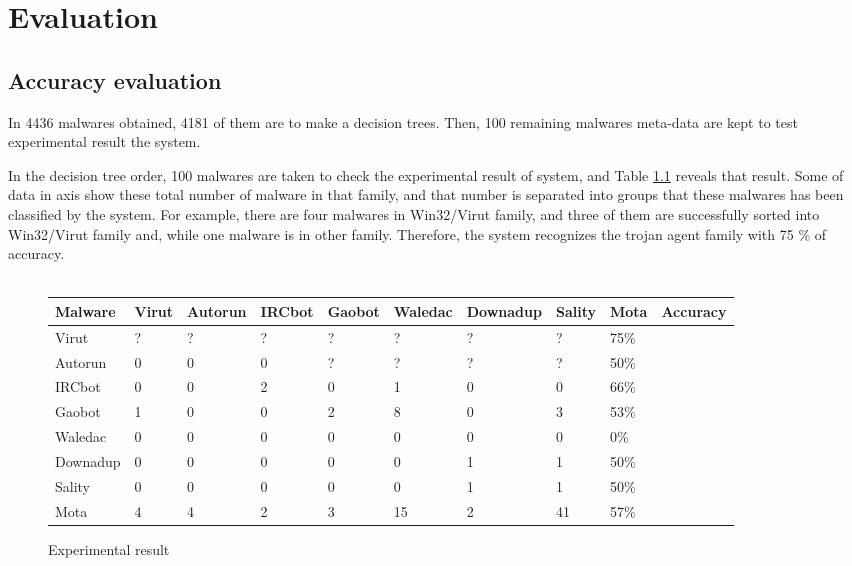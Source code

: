 \chapter{Evaluation}\label{chap:6}


\section{Accuracy evaluation}
In 4436 malwares obtained, 4181 of them are to make a decision trees. Then, 100 remaining malwares meta-data are kept to test experimental result the system.

In the decision tree order, 100 malwares are taken to check the experimental result of system, and Table \ref{fig:experimentalresult} reveals that result. Some of data in axis show these total number of malware in that family, and that number is separated into groups that these malwares has been classified by the system. For example, there are four malwares in Win32/Virut family, and three of them are successfully sorted into Win32/Virut family and, while one malware is in other family. Therefore, the system recognizes the trojan agent family with 75 \% of accuracy.\\
\\

\begin{figure}[h!]
  \begin{center}
    \begin{tabular}{ | l | l | l | l | l | l | l | l | l | l |}
     \hline
    Malware & Virut & Autorun & IRCbot & Gaobot & Waledac & Downadup & Sality & Mota & Accuracy\\ \hline
    Virut & ? & ? & ? & ? & ? & ? & ? & 75\% \\ \hline
	Autorun & 0 & 0 & 0 & ? & ? & ? & ? & 50\% \\ \hline
	IRCbot & 0 & 0 & 2 & 0 & 1 & 0 & 0 & 66\% \\ \hline
	Gaobot & 1 & 0 & 0 & 2 & 8 & 0 & 3 & 53\% \\ \hline
	Waledac & 0 & 0 & 0 & 0 & 0 & 0 & 0 & 0\% \\ \hline
	Downadup & 0 & 0 & 0 & 0 & 0 & 1 & 1 & 50\% \\ \hline
	Sality & 0 & 0 & 0 & 0 & 0 & 1 & 1 & 50\% \\ \hline
	Mota & 4 & 4 & 2 & 3 & 15 & 2 & 41 & 57\% \\ \hline

    \end{tabular}
	\end{center}
     \caption{Experimental result}
    \label{fig:experimentalresult}
\end{figure} 


